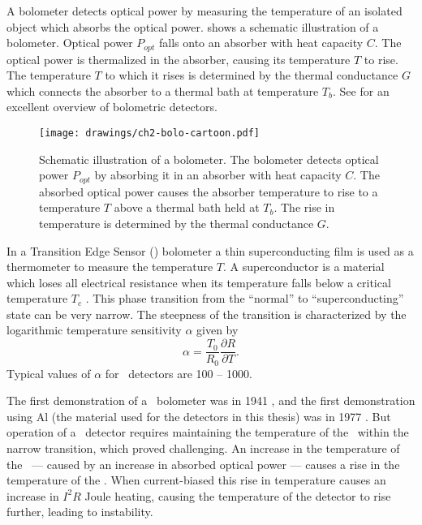A bolometer detects optical power by measuring the temperature of an isolated object which absorbs the optical power.
 shows a schematic illustration of a bolometer.
Optical power $P_{opt}$ falls onto an absorber with heat capacity $C$.
The optical power is thermalized in the absorber, causing its temperature $T$ to rise.
The temperature $T$ to which it rises is determined by the thermal conductance $G$ which connects the absorber to a thermal bath at temperature $T_b$.
See \cite{richards_bolometers_1994} for an excellent overview of bolometric detectors.

\begin{figure*}
\centering
\texttt{[image: drawings/ch2-bolo-cartoon.pdf]}
\caption[Bolometer schematic]{
  Schematic illustration of a bolometer.
  The bolometer detects optical power $P_{opt}$ by absorbing it in an absorber with heat capacity $C$.
  The absorbed optical power causes the absorber temperature to rise to a temperature $T$ above a thermal bath held at $T_b$.
  The rise in temperature is determined by the thermal conductance $G$.
}
\label{fig:ch2-bolo-cartoon}
\end{figure*}

In a Transition Edge Sensor (\TES) bolometer a thin superconducting film is used as a thermometer to measure the temperature $T$.
A superconductor is a material which loses all electrical resistance when its temperature falls below a critical temperature $T_c$ \cite{tinkham_introduction_1996}.
This phase transition from the ``normal'' to ``superconducting'' state can be very narrow.
The steepness of the transition is characterized by the logarithmic temperature sensitivity $\alpha$ given by
\begin{equation}
  \alpha = \frac{T_0}{R_0} \frac{\partial R}{\partial T}.
\end{equation}
Typical values of $\alpha$ for \TES\ detectors are 100 -- 1000.

The first demonstration of a \TES\ bolometer was in 1941 \cite{andrews_attenuated_1942}, and the first demonstration using Al (the material used for the detectors in this thesis) was in 1977 \cite{clarke_superconductive_1977}.
But operation of a \TES\ detector requires maintaining the temperature of the \TES\ within the narrow transition, which proved challenging.
An increase in the temperature of the \TES\ --- caused by an increase in absorbed optical power --- causes a rise in the temperature of the \TES.
When current-biased this rise in temperature causes an increase in $I^2 R$ Joule heating, causing the temperature of the detector to rise further, leading to instability.


